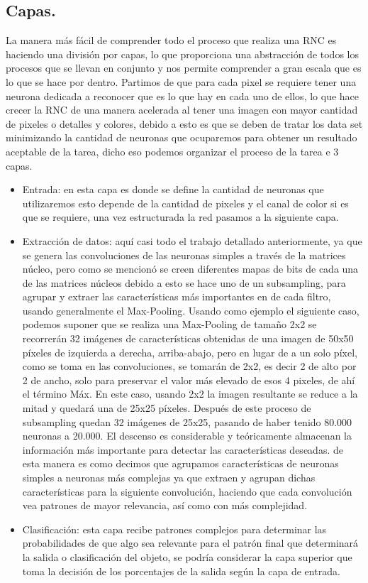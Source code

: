 \documentclass[a4paper, 12pt]{article}
\begin{document}
    \subsection{Capas.}
    La manera más fácil de comprender todo el proceso que realiza una RNC es haciendo una división por capas, lo que proporciona una abstracción de todos los procesos que se llevan en conjunto y nos permite comprender a gran escala que es lo que se hace por dentro. Partimos de que para cada pixel se requiere tener una neurona dedicada a reconocer que es lo que hay en cada uno de ellos, lo que hace crecer la RNC de una manera acelerada al tener una imagen con mayor cantidad de pixeles o detalles y colores, debido a esto es que se deben de tratar los data set minimizando la cantidad de neuronas que ocuparemos para obtener un resultado aceptable de la tarea, dicho eso podemos organizar el proceso de la tarea e 3 capas. 
    \begin{itemize}
    \item Entrada: en esta capa es donde se define la cantidad de neuronas que utilizaremos esto depende de la cantidad de pixeles y el canal de color si es que se requiere, una vez estructurada la red pasamos a la siguiente capa. 
    \item Extracción de datos: aquí casi todo el trabajo detallado anteriormente, ya que se genera las convoluciones de las neuronas simples a través de la matrices núcleo, pero como se mencionó se creen diferentes mapas de bits de cada una de las matrices núcleos debido a esto se hace uno de un subsampling, para agrupar y extraer las características más importantes en de cada filtro, usando generalmente el Max-Pooling.  
    Usando como ejemplo el siguiente caso, podemos suponer que se realiza una Max-Pooling de tamaño 2x2 se recorrerán 32 imágenes de características obtenidas de una imagen de 50x50 píxeles de izquierda a derecha, arriba-abajo, pero en lugar de a un solo píxel, como se toma en las convoluciones, se tomarán de 2x2, es decir 2 de alto por 2 de ancho, solo para preservar el valor más elevado de esos 4 pixeles, de ahí el término Máx. En este caso, usando 2x2 la imagen resultante se reduce a la mitad y quedará una de 25x25 píxeles. Después de este proceso de subsampling quedan 32 imágenes de 25x25, pasando de haber tenido 80.000 neuronas a 20.000. El descenso es considerable y teóricamente almacenan la información más importante para detectar las características deseadas. de esta manera es como decimos que agrupamos características de neuronas simples a neuronas más complejas ya que extraen y agrupan dichas características para la siguiente convolución, haciendo que cada convolución vea patrones de mayor relevancia, así como con más complejidad. 
    \item Clasificación: esta capa recibe patrones complejos para determinar las probabilidades de que algo sea relevante para el patrón final que determinará la salida o clasificación del objeto, se podría considerar la capa superior que toma la decisión de los porcentajes de la salida según la capa de entrada. 
    \end{itemize}
\end{document}
